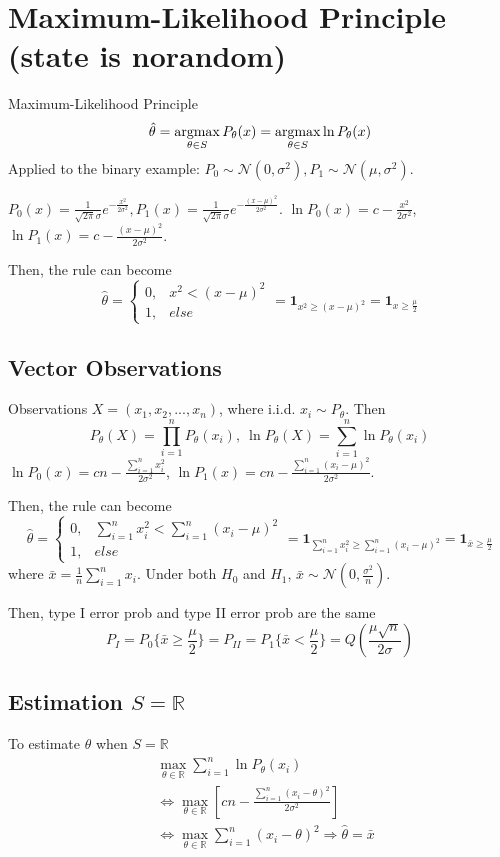 \documentclass[11pt]{elegantbook}
\newcommand{\argmax}{\operatornamewithlimits{argmax}}
\begin{document}
\section{Maximum-Likelihood Principle (state is norandom)}
Maximum-Likelihood Principle $$\hat{\theta}=\argmax_{\theta\in S}P_{\theta}(x)=\argmax_{\theta\in S}\ln P_{\theta}(x)$$
Applied to the binary example: $P_0\sim \mathcal{N}(0,\sigma^2), P_1\sim \mathcal{N}(\mu,\sigma^2)$.

$P_0(x)=\frac{1}{\sqrt{2\pi}\sigma}e^{-\frac{x^2}{2\sigma^2}}, P_1(x)=\frac{1}{\sqrt{2\pi}\sigma}e^{-\frac{(x-\mu)^2}{2\sigma^2}}$. $\ln P_0(x)=c-\frac{x^2}{2\sigma^2}$, $\ln P_1(x)=c-\frac{(x-\mu)^2}{2\sigma^2}$.

Then, the rule can become $$\hat{\theta}=\left\{\begin{matrix}
    0,&x^2<(x-\mu)^2\\
    1,&else
\end{matrix}\right.=\mathbf{1}_{x^2\geq (x-\mu)^2}=\mathbf{1}_{x\geq \frac{\mu}{2}}$$

\subsection*{Vector Observations}
Observations $X=\left(x_1,x_2,...,x_n\right)$, where i.i.d. $x_i\sim P_\theta$. Then $$P_\theta(X)=\prod_{i=1}^n P_\theta(x_i),\ \ln P_\theta(X)=\sum_{i=1}^n\ln P_\theta(x_i)$$
$\ln P_0(x)=cn-\frac{\sum_{i=1}^n x_i^2}{2\sigma^2}$, $\ln P_1(x)=cn-\frac{\sum_{i=1}^n(x_i-\mu)^2}{2\sigma^2}$.

Then, the rule can become $$\hat{\theta}=\left\{\begin{matrix}
    0,&\sum_{i=1}^nx_i^2<\sum_{i=1}^n(x_i-\mu)^2\\
    1,&else
\end{matrix}\right.=\mathbf{1}_{\sum_{i=1}^nx_i^2\geq \sum_{i=1}^n(x_i-\mu)^2}=\mathbf{1}_{\bar{x}\geq \frac{\mu}{2}}$$
where $\bar{x}=\frac{1}{n}\sum_{i=1}^nx_i$. Under both $H_0$ and $H_1$, $\bar{x}\sim \mathcal{N}(0,\frac{\sigma^2}{n})$.

Then, type I error prob and type II error prob are the same $$P_I=P_0\{\bar{x}\geq \frac{\mu}{2}\}=P_{II}=P_1\{\bar{x}< \frac{\mu}{2}\}=Q\left(\frac{\mu\sqrt{n}}{2\sigma}\right)$$

\subsection*{Estimation $S=\mathbb{R}$}
To estimate $\theta$ when $S=\mathbb{R}$
\begin{equation}
    \begin{aligned}
        &\max_{\theta\in \mathbb{R}}\sum_{i=1}^n\ln P_\theta(x_i)\\
        &\Leftrightarrow \max_{\theta\in \mathbb{R}} \left[cn-\frac{\sum_{i=1}^n(x_i-\theta)^2}{2\sigma^2}\right]\\
        &\Leftrightarrow \max_{\theta\in \mathbb{R}} \sum_{i=1}^n(x_i-\theta)^2 \Rightarrow \hat{\theta}=\bar{x}
    \end{aligned}
    \nonumber
\end{equation}
\end{document}
